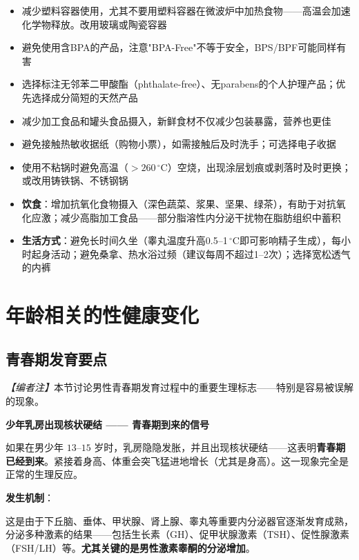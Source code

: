 \begin{enumerate}
\begin{itemize}[leftmargin=2cm]
	\item 减少塑料容器使用，尤其不要用塑料容器在微波炉中加热食物——高温会加速化学物释放。改用玻璃或陶瓷容器
	\item 避免使用含BPA的产品，注意"BPA-Free"不等于安全，BPS/BPF可能同样有害
	\item 选择标注无邻苯二甲酸酯（phthalate-free）、无parabens的个人护理产品；优先选择成分简短的天然产品
	\item 减少加工食品和罐头食品摄入，新鲜食材不仅减少包装暴露，营养也更佳
	\item 避免接触热敏收据纸（购物小票），如需接触后及时洗手；可选择电子收据
	\item 使用不粘锅时避免高温（$>260\,^\circ$C）空烧，出现涂层划痕或剥落时及时更换；或改用铸铁锅、不锈钢锅
	\item \textbf{饮食}：增加抗氧化食物摄入（深色蔬菜、浆果、坚果、绿茶），有助于对抗氧化应激；减少高脂加工食品——部分脂溶性内分泌干扰物在脂肪组织中蓄积
	\item \textbf{生活方式}：避免长时间久坐（睾丸温度升高0.5--1$\,^\circ$C即可影响精子生成），每小时起身活动；避免桑拿、热水浴过频（建议每周不超过1--2次）；选择宽松透气的内裤
\end{itemize}

\section{年龄相关的性健康变化}
\subsection{青春期发育要点}

\noindent\textit{【编者注】}本节讨论男性青春期发育过程中的重要生理标志——特别是容易被误解的现象。

\vspace{0.5em}
\noindent\textbf{少年乳房出现核状硬结 —— 青春期到来的信号}

如果在男少年 $13$--$15$ 岁时，乳房隐隐发胀，并且出现核状硬结——这表明\textbf{青春期已经到来}。紧接着身高、体重会突飞猛进地增长（尤其是身高）。这一现象完全是正常的生理反应。

\vspace{0.5em}
\noindent\textbf{发生机制}：

这是由于下丘脑、垂体、甲状腺、肾上腺、睾丸等重要内分泌器官逐渐发育成熟，分泌多种激素的结果——包括生长素（GH）、促甲状腺激素（TSH）、促性腺激素（FSH/LH）等。\textbf{尤其关键的是男性激素睾酮的分泌增加}。


\end{enumerate}

